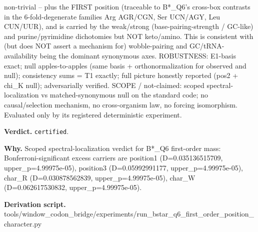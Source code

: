 non-trivial -- plus the FIRST position (traceable to B*\_Q6's cross-box contrasts in the
6-fold-degenerate families Arg AGR/CGN, Ser UCN/AGY, Leu CUN/UUR), and is carried by the weak/strong
(base-pairing-strength / GC-like) and purine/pyrimidine dichotomies but NOT keto/amino. This is
consistent with (but does NOT assert a mechanism for) wobble-pairing and GC/tRNA-availability being
the dominant synonymous axes. ROBUSTNESS: E1-basis exact; null apples-to-apples (same basis +
orthonormalization for observed and null); consistency sums = T1 exactly; full picture honestly
reported (pos2 + chi\_K null); adversarially verified. SCOPE / not-claimed: scoped
spectral-localization vs matched-synonymous null on the standard code; no causal/selection
mechanism, no cross-organism law, no forcing isomorphism. Evaluated only by its registered
deterministic experiment.

\textbf{Verdict.} \texttt{certified}.

\textbf{Why.} Scoped spectral-localization verdict for B*\_Q6 first-order mass: Bonferroni-significant excess
carriers are position1 (D=0.035136515709, upper\_p=4.99975e-05), position3 (D=0.05992991177,
upper\_p=4.99975e-05), char\_R (D=0.030878562839, upper\_p=4.99975e-05), char\_W (D=0.062617530832,
upper\_p=4.99975e-05).

\textbf{Derivation script.} tools/window\_codon\_bridge/experiments/run\_bstar\_q6\_first\_order\_position\_character.py

